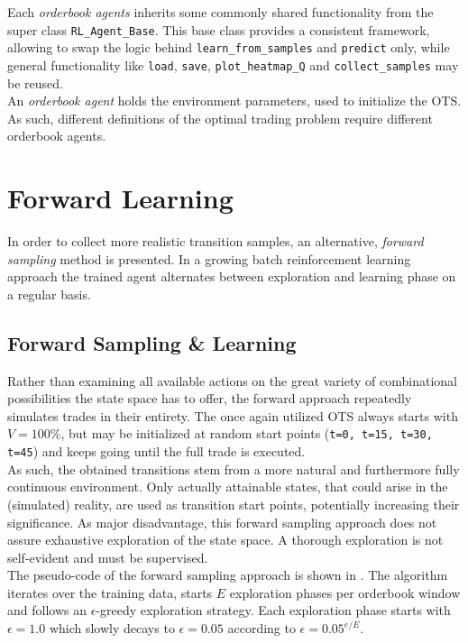 Each \emph{orderbook agents} inherits some commonly shared functionality from the super class \lstinline!RL_Agent_Base!. This base class provides a consistent framework, allowing to swap the logic behind \lstinline!learn_from_samples! and \lstinline!predict! only, while general functionality like \lstinline!load!, \lstinline!save!, \lstinline!plot_heatmap_Q! and \lstinline!collect_samples! may be reused.\\

An \emph{orderbook agent} holds the environment parameters, used to initialize the \ac{OTS}. As such, different definitions of the optimal trading problem require different orderbook agents.






\section{Forward Learning}
\label{chap:forwardlearning}
In order to collect more realistic transition samples, an alternative, \emph{forward sampling} method is presented. In a growing batch reinforcement learning approach the trained agent alternates between exploration and learning phase on a regular basis.

\subsection{Forward Sampling \& Learning}
Rather than examining all available actions on the great variety of combinational possibilities the state space has to offer, the forward approach repeatedly simulates trades in their entirety. The once again utilized \ac{OTS} always starts with $V=100\%$, but may be initialized at random start points (\eg \lstinline!t=0, t=15, t=30, t=45!) and keeps going until the full trade is executed.\\

As such, the obtained transitions stem from a more natural and furthermore fully continuous environment. Only actually attainable states, that could arise in the (simulated) reality, are used as transition start points, potentially increasing their significance. As major disadvantage, this forward sampling approach does not assure exhaustive exploration of the state space. A thorough exploration is not self-evident and must be supervised.\\

The pseudo-code of the forward sampling approach is shown in . The algorithm iterates over the training data, starts $E$ exploration phases per orderbook window and follows an $\epsilon$-greedy exploration strategy. Each exploration phase starts with $\epsilon=1.0$ which slowly decays to $\epsilon=0.05$ according to $\epsilon=0.05^{e/E}$.\\

